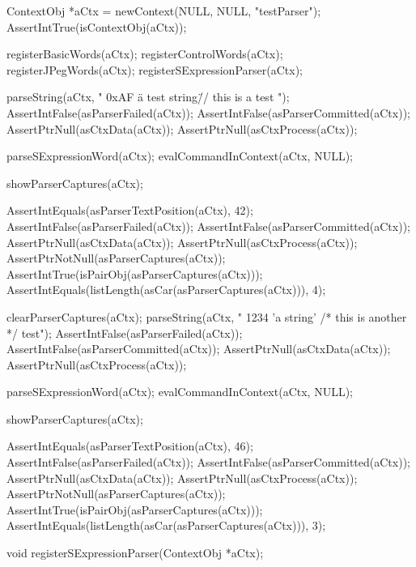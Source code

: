 \startCTest
  ContextObj *aCtx = newContext(NULL, NULL, "testParser");
  AssertIntTrue(isContextObj(aCtx));
  
  registerBasicWords(aCtx);
  registerControlWords(aCtx);
  registerJPegWords(aCtx);
  registerSExpressionParser(aCtx);
  
  parseString(aCtx, " 0xAF \"a test string\" // this is \n a test ");
  AssertIntFalse(asParserFailed(aCtx));
  AssertIntFalse(asParserCommitted(aCtx));
  AssertPtrNull(asCtxData(aCtx));
  AssertPtrNull(asCtxProcess(aCtx));
  
  parseSExpressionWord(aCtx);
  evalCommandInContext(aCtx, NULL);
  
  showParserCaptures(aCtx);
  
  AssertIntEquals(asParserTextPosition(aCtx), 42);
  AssertIntFalse(asParserFailed(aCtx));
  AssertIntFalse(asParserCommitted(aCtx));
  AssertPtrNull(asCtxData(aCtx));
  AssertPtrNull(asCtxProcess(aCtx));
  AssertPtrNotNull(asParserCaptures(aCtx));
  AssertIntTrue(isPairObj(asParserCaptures(aCtx)));
  AssertIntEquals(listLength(asCar(asParserCaptures(aCtx))), 4);
  
  clearParserCaptures(aCtx);
  parseString(aCtx, " 1234 'a string' /* this is \n another  */ test");
  AssertIntFalse(asParserFailed(aCtx));
  AssertIntFalse(asParserCommitted(aCtx));
  AssertPtrNull(asCtxData(aCtx));
  AssertPtrNull(asCtxProcess(aCtx));
  
  parseSExpressionWord(aCtx);
  evalCommandInContext(aCtx, NULL);

  showParserCaptures(aCtx);
  
  AssertIntEquals(asParserTextPosition(aCtx), 46);
  AssertIntFalse(asParserFailed(aCtx));
  AssertIntFalse(asParserCommitted(aCtx));
  AssertPtrNull(asCtxData(aCtx));
  AssertPtrNull(asCtxProcess(aCtx));
  AssertPtrNotNull(asParserCaptures(aCtx));
  AssertIntTrue(isPairObj(asParserCaptures(aCtx)));
  AssertIntEquals(listLength(asCar(asParserCaptures(aCtx))), 3);
\stopCTest
\stopTestCase
\stopTestSuite

\startCHeader
void registerSExpressionParser(ContextObj *aCtx);
\stopCHeader

